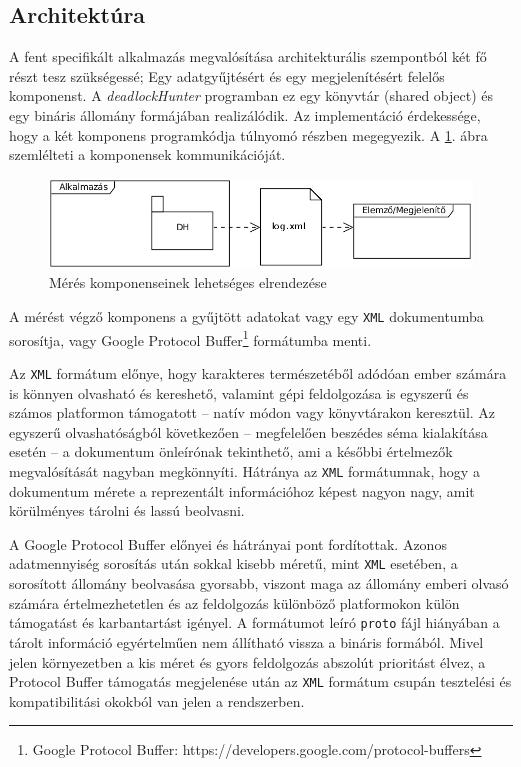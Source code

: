     \subsection{Architektúra}
    A fent specifikált alkalmazás megvalósítása architekturális szempontból két fő részt tesz szükségessé; Egy adatgyűjtésért és egy megjelenítésért felelős komponenst. A \emph{deadlockHunter} programban ez egy könyvtár (shared object) és egy bináris állomány formájában realizálódik. Az implementáció érdekessége, hogy a két komponens programkódja túlnyomó részben megegyezik. A \ref{fig:architecture}. ábra szemlélteti a komponensek kommunikációját.
    
\begin{figure}[ht!]
  \centering
    \includegraphics[width=5.4in]{figures/arch}
  \caption{Mérés komponenseinek lehetséges elrendezése}
  \label{fig:architecture}
\end{figure}    
%    
    A mérést végző komponens a gyűjtött adatokat vagy egy \texttt{XML} dokumentumba sorosítja, vagy Google Protocol Buffer\footnote{Google Protocol Buffer: https://developers.google.com/protocol-buffers} formátumba menti. 
    
    Az \texttt{XML} formátum előnye, hogy karakteres természetéből adódóan ember számára is könnyen olvasható és kereshető, valamint gépi feldolgozása is egyszerű és számos platformon támogatott -- natív módon vagy könyvtárakon keresztül. Az egyszerű olvashatóságból következően -- megfelelően beszédes séma kialakítása esetén -- a dokumentum önleírónak tekinthető, ami a későbbi értelmezők megvalósítását nagyban megkönnyíti. Hátránya az \texttt{XML} formátumnak, hogy a dokumentum mérete a reprezentált információhoz képest nagyon nagy, amit körülményes tárolni és lassú beolvasni.
    
    A Google Protocol Buffer előnyei és hátrányai pont fordítottak. Azonos adatmennyiség sorosítás után sokkal kisebb méretű, mint \texttt{XML} esetében, a sorosított állomány beolvasása gyorsabb, viszont maga az állomány emberi olvasó számára értelmezhetetlen és az feldolgozás különböző platformokon külön támogatást és karbantartást igényel. A formátumot leíró \texttt{proto} fájl hiányában a tárolt információ egyértelműen nem állítható vissza a bináris formából. Mivel jelen környezetben a kis méret és gyors feldolgozás abszolút prioritást élvez, a Protocol Buffer támogatás megjelenése után az \texttt{XML} formátum csupán tesztelési és kompatibilitási okokból van jelen a rendszerben.
    
